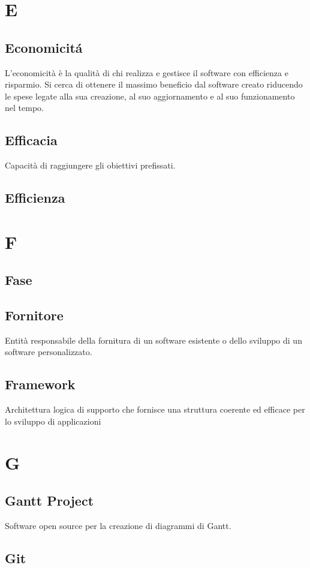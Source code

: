 \documentclass[12pt]{article}
\begin{document}
	\clearpage
	\section{E}
		\subsection{Economicit\'a}
			L’economicità è la qualità di chi realizza e gestisce il software con efficienza e risparmio. Si cerca di ottenere il massimo beneficio dal software creato riducendo le spese legate alla sua creazione, al suo aggiornamento e al suo funzionamento nel tempo.
		\subsection{Efficacia}
		Capacità di raggiungere gli obiettivi prefissati.
		\subsection{Efficienza}
	\clearpage
	\section{F}
		\subsection{Fase}

		\subsection{Fornitore}
		Entità responsabile della fornitura di un software esistente o dello sviluppo di un software personalizzato.
		\subsection{Framework} %
		Architettura logica di supporto che fornisce una struttura coerente ed efficace per lo sviluppo di applicazioni

	\clearpage
	\section{G}
		\subsection{Gantt Project}
		 Software open source per la creazione di diagrammi di Gantt.
		\subsection{Git}
\end{document}
